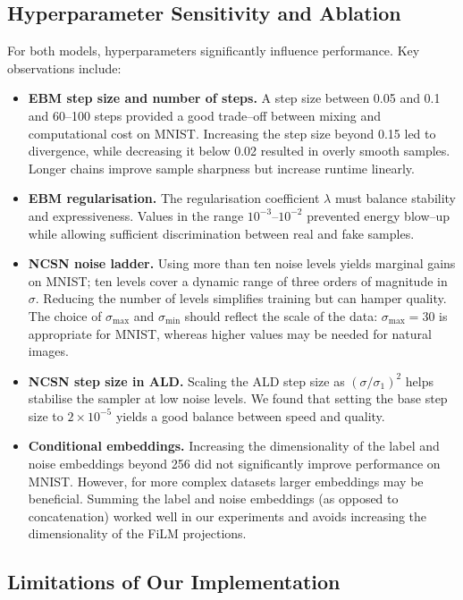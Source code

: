 \subsection{Hyperparameter Sensitivity and Ablation}

For both models, hyperparameters significantly influence performance.
Key observations include:

\begin{itemize}[leftmargin=*]
  \item \textbf{EBM step size and number of steps.}  A step size
    between 0.05 and 0.1 and 60–100 steps provided a good trade–off
    between mixing and computational cost on MNIST.  Increasing the step
    size beyond 0.15 led to divergence, while decreasing it below 0.02
    resulted in overly smooth samples.  Longer chains improve sample
    sharpness but increase runtime linearly.
  \item \textbf{EBM regularisation.}  The regularisation coefficient
    $\lambda$ must balance stability and expressiveness.  Values in the
    range $10^{-3}$–$10^{-2}$ prevented energy blow–up while allowing
    sufficient discrimination between real and fake samples.
  \item \textbf{NCSN noise ladder.}  Using more than ten noise levels
    yields marginal gains on MNIST; ten levels cover a dynamic range of
    three orders of magnitude in $\sigma$.  Reducing the number of levels
    simplifies training but can hamper quality.  The choice of
    $\sigma_{\max}$ and $\sigma_{\min}$ should reflect the scale of the
    data: $\sigma_{\max}=30$ is appropriate for MNIST, whereas higher
    values may be needed for natural images.
  \item \textbf{NCSN step size in ALD.}  Scaling the ALD step size as
    $(\sigma/\sigma_1)^2$ helps stabilise the sampler at low noise
    levels.  We found that setting the base step size to $2\times 10^{-5}$
    yields a good balance between speed and quality.
  \item \textbf{Conditional embeddings.}  Increasing the dimensionality
    of the label and noise embeddings beyond 256 did not significantly
    improve performance on MNIST.  However, for more complex datasets
    larger embeddings may be beneficial.  Summing the label and noise
    embeddings (as opposed to concatenation) worked well in our
    experiments and avoids increasing the dimensionality of the FiLM
    projections.
\end{itemize}

\subsection{Limitations of Our Implementation}

